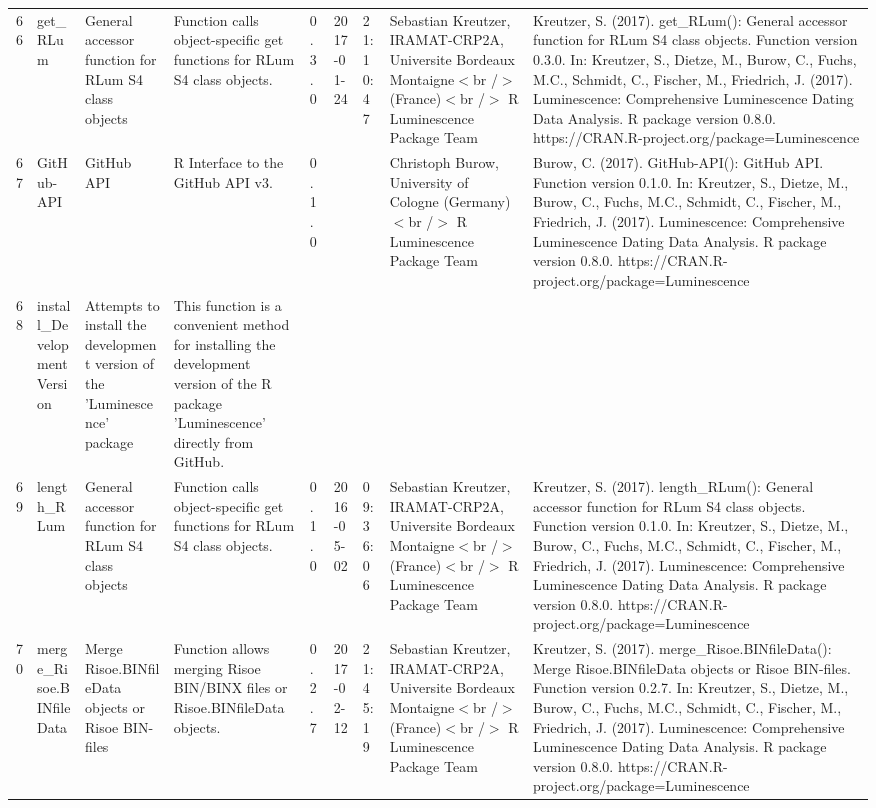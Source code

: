 \begin{table}[ht]
\begin{tabular}{rllllllll}
  66 & get\_RLum & General accessor function for RLum S4 class objects & Function calls object-specific get functions for RLum S4 class objects. & 0.3.0 & 2017-01-24 & 21:10:47
 & Sebastian Kreutzer, IRAMAT-CRP2A, Universite Bordeaux Montaigne$<$br /$>$ (France)$<$br /$>$  R Luminescence Package Team & Kreutzer, S. (2017). get\_RLum(): General accessor function for RLum S4 class objects. Function version 0.3.0. In: Kreutzer, S., Dietze, M., Burow, C., Fuchs, M.C., Schmidt, C., Fischer, M., Friedrich, J. (2017). Luminescence: Comprehensive Luminescence Dating Data Analysis. R package version 0.8.0. https://CRAN.R-project.org/package=Luminescence
 \\ 
  67 & GitHub-API & GitHub API & R Interface to the GitHub API v3. & 0.1.0
 &  &  & Christoph Burow, University of Cologne (Germany)$<$br /$>$  R Luminescence Package Team & Burow, C. (2017). GitHub-API(): GitHub API. Function version 0.1.0. In: Kreutzer, S., Dietze, M., Burow, C., Fuchs, M.C., Schmidt, C., Fischer, M., Friedrich, J. (2017). Luminescence: Comprehensive Luminescence Dating Data Analysis. R package version 0.8.0. https://CRAN.R-project.org/package=Luminescence
 \\ 
  68 & install\_DevelopmentVersion & Attempts to install the development version of the 'Luminescence' package & This function is a convenient method for installing the development version of the R package 'Luminescence' directly from GitHub. &  &  &  &  &  \\ 
  69 & length\_RLum & General accessor function for RLum S4 class objects & Function calls object-specific get functions for RLum S4 class objects. & 0.1.0 & 2016-05-02 & 09:36:06
 & Sebastian Kreutzer, IRAMAT-CRP2A, Universite Bordeaux Montaigne$<$br /$>$ (France)$<$br /$>$  R Luminescence Package Team & Kreutzer, S. (2017). length\_RLum(): General accessor function for RLum S4 class objects. Function version 0.1.0. In: Kreutzer, S., Dietze, M., Burow, C., Fuchs, M.C., Schmidt, C., Fischer, M., Friedrich, J. (2017). Luminescence: Comprehensive Luminescence Dating Data Analysis. R package version 0.8.0. https://CRAN.R-project.org/package=Luminescence
 \\ 
  70 & merge\_Risoe.BINfileData & Merge Risoe.BINfileData objects or Risoe BIN-files & Function allows merging Risoe BIN/BINX files or Risoe.BINfileData objects. & 0.2.7 & 2017-02-12 & 21:45:19
 & Sebastian Kreutzer, IRAMAT-CRP2A, Universite Bordeaux Montaigne$<$br /$>$ (France)$<$br /$>$  R Luminescence Package Team & Kreutzer, S. (2017). merge\_Risoe.BINfileData(): Merge Risoe.BINfileData objects or Risoe BIN-files. Function version 0.2.7. In: Kreutzer, S., Dietze, M., Burow, C., Fuchs, M.C., Schmidt, C., Fischer, M., Friedrich, J. (2017). Luminescence: Comprehensive Luminescence Dating Data Analysis. R package version 0.8.0. https://CRAN.R-project.org/package=Luminescence

\end{tabular}
\end{table}
